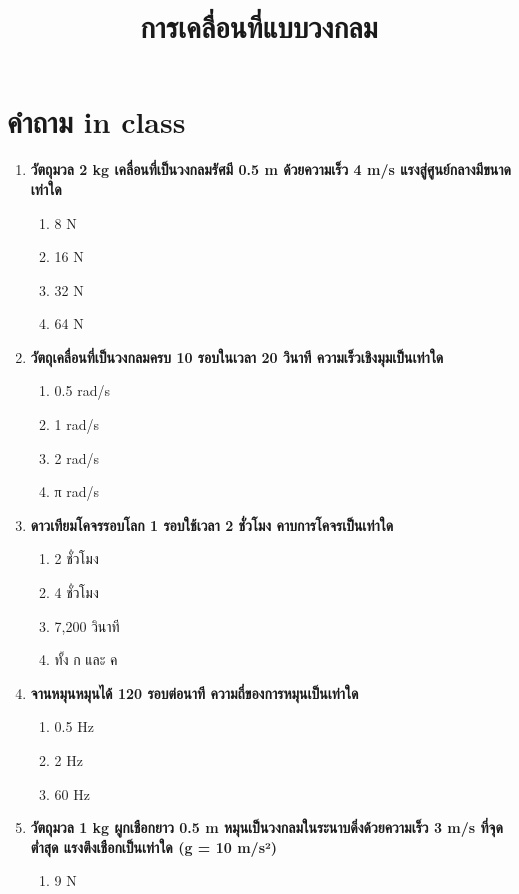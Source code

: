 \documentclass[12pt]{article}
\begin{document}
\title{การเคลื่อนที่แบบวงกลม}
\maketitle
\section*{คำถาม in class}
\begin{enumerate}
\def\labelenumi{\arabic*.}
\normalfont
\item \textbf{วัตถุมวล 2 kg เคลื่อนที่เป็นวงกลมรัศมี 0.5 m ด้วยความเร็ว 4 m/s แรงสู่ศูนย์กลางมีขนาดเท่าใด}
\begin{enumerate}[label=\alph*)]
\item 8 N
\item 16 N
\item 32 N
\item 64 N
\end{enumerate}
\item \textbf{วัตถุเคลื่อนที่เป็นวงกลมครบ 10 รอบในเวลา 20 วินาที ความเร็วเชิงมุมเป็นเท่าใด}
\begin{enumerate}[label=\alph*)]
\item 0.5 rad/s
\item 1 rad/s
\item 2 rad/s
\item π rad/s
\end{enumerate}
\item \textbf{ดาวเทียมโคจรรอบโลก 1 รอบใช้เวลา 2 ชั่วโมง คาบการโคจรเป็นเท่าใด}
\begin{enumerate}[label=\alph*)]
\item 2 ชั่วโมง
\item 4 ชั่วโมง
\item 7,200 วินาที
\item ทั้ง ก และ ค
\end{enumerate}
\item \textbf{จานหมุนหมุนได้ 120 รอบต่อนาที ความถี่ของการหมุนเป็นเท่าใด}
\begin{enumerate}[label=\alph*)]
\item 0.5 Hz
\item 2 Hz
\item 60 Hz
\end{enumerate}
\item \textbf{วัตถุมวล 1 kg ผูกเชือกยาว 0.5 m หมุนเป็นวงกลมในระนาบดิ่งด้วยความเร็ว 3 m/s ที่จุดต่ำสุด แรงตึงเชือกเป็นเท่าใด (g = 10 m/s²)}
\begin{enumerate}[label=\alph*)]
\item 9 N

\end{enumerate}
\end{enumerate}
\end{document}

